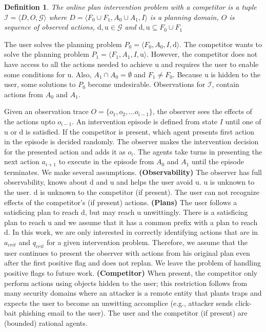 \documentclass[letterpaper]{article}
\theoremstyle{plain}
\newtheorem{definition}{Definition}
\begin{document}
\begin{definition}
The \textnormal{online plan intervention problem} with a competitor is a tuple $\mathcal{I} = \langle D, O, \mathcal{G} \rangle$ where $D=\langle F_0\cup F_1, A_0\cup A_1, I \rangle$ is a planning domain, 
$O$ is  sequence of observed actions, $\mathrm{d},\mathrm{u} \in \mathcal{G}$ and 
$\mathrm{d}, \mathrm{u} \subseteq F_0\cup F_1$
\end{definition}
The user solves the planning problem $P_0=\langle F_0, A_0, I,\mathrm{d}\rangle$.
The competitor wants to solve the planning problem $P_1=\langle F_1, A_1, I,\mathrm{u}\rangle$.
However, the competitor does not have access to all the actions needed to achieve $\mathrm{u}$ and requires the user to enable some conditions for $\mathrm{u}$. Also, $A_1 \cap A_0=\emptyset$ and $F_1 \neq F_0$. Because $\mathrm{u}$ is hidden to the user, some solutions to $P_0$ become undesirable.
Observations for $\mathcal{I}$, contain actions from $A_0$ and $A_1$.
 

Given an observation trace $O = \lbrace o_1, o_2,\ldots o_{i-1}\rbrace$, the observer sees the effects of the actions upto $o_{i-1}$. An intervention episode is defined from state $I$ until one of $\mathrm{u}$ or $\mathrm{d}$ is satisfied. If the competitor is present, which agent presents first action in the episode is decided randomly. The observer makes the intervention decision for the presented action and adds it as $o_{i}$. The agents take turns in presenting the next action $a_{i+1}$ to execute in the episode from $A_0$ and $A_1$ until the episode terminates.
We make several assumptions.
\textbf{(Observability)} 
The observer has full observability, knows about  $\mathrm{d}$ and $\mathrm{u}$ and helps the user avoid $\mathrm{u}$. $\mathrm{u}$ is unknown to the user. $\mathrm{d}$ is unknown to the competitor (if present).
The user can not recognize effects of the competitor's (if present) actions. 
\textbf{(Plans)} 
The user follows a satisficing plan to reach $\mathrm{d}$, but may reach $\mathrm{u}$ unwittingly. 
There is a satisficing plan to reach $\mathrm{u}$ and we assume that it has a common prefix with a plan to reach $\mathrm{d}$. In this work, we are only interested in correctly identifying actions that are in $a_{crit}$ and $q_{crit}$ for a given intervention problem. Therefore, we assume that  the user continues to present the observer with actions from his original plan even after the first positive flag and does not replan. We leave the problem of handling positive flags to future work.
\textbf{(Competitor)}
When present, the competitor only perform actions using objects hidden to the user; this restriction follows from many security domains where an attacker is a remote entity that plants traps and expects the user to become an unwitting accomplice (e.g., attacker sends click-bait phishing email to the user).
The user and the competitor (if present) are (bounded) rational agents.
\end{document}
